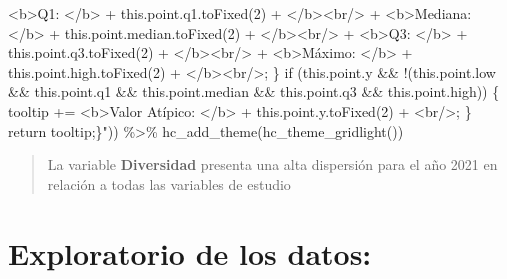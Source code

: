 \documentclass[
  10pt,
  letterpaper,
  DIV=11,
  numbers=noendperiod]{scrreprt}
\newenvironment{Shaded}{\begin{snugshade}}{\end{snugshade}}
\newcommand{\FunctionTok}[1]{\textcolor[rgb]{0.28,0.35,0.67}{#1}}
\newcommand{\NormalTok}[1]{\textcolor[rgb]{0.00,0.23,0.31}{#1}}
\newcommand{\SpecialCharTok}[1]{\textcolor[rgb]{0.37,0.37,0.37}{#1}}
\newcommand{\StringTok}[1]{\textcolor[rgb]{0.13,0.47,0.30}{#1}}
\begin{document}
\begin{Shaded}
\begin{Highlighting}[numbers=left,,]
\StringTok{                   \textquotesingle{}\textless{}b\textgreater{}Q1: \textless{}/b\textgreater{}\textquotesingle{} + this.point.q1.toFixed(2) + \textquotesingle{}\textless{}/b\textgreater{}\textless{}br/\textgreater{}\textquotesingle{} +}
\StringTok{                   \textquotesingle{}\textless{}b\textgreater{}Mediana: \textless{}/b\textgreater{}\textquotesingle{} + this.point.median.toFixed(2) + \textquotesingle{}\textless{}/b\textgreater{}\textless{}br/\textgreater{}\textquotesingle{} +}
\StringTok{                   \textquotesingle{}\textless{}b\textgreater{}Q3: \textless{}/b\textgreater{}\textquotesingle{} + this.point.q3.toFixed(2) + \textquotesingle{}\textless{}/b\textgreater{}\textless{}br/\textgreater{}\textquotesingle{} +}
\StringTok{                   \textquotesingle{}\textless{}b\textgreater{}Máximo: \textless{}/b\textgreater{}\textquotesingle{} + this.point.high.toFixed(2) + \textquotesingle{}\textless{}/b\textgreater{}\textless{}br/\textgreater{}\textquotesingle{};}
\StringTok{    \}}
\StringTok{    if (this.point.y \&\& !(this.point.low \&\& this.point.q1 \&\& this.point.median \&\& this.point.q3 \&\& this.point.high)) \{ }
\StringTok{        tooltip += \textquotesingle{}\textless{}b\textgreater{}Valor Atípico: \textless{}/b\textgreater{}\textquotesingle{} + this.point.y.toFixed(2) + \textquotesingle{}\textless{}br/\textgreater{}\textquotesingle{};}
\StringTok{    \}}
\StringTok{    return tooltip;\}"}\NormalTok{)) }\SpecialCharTok{\%\textgreater{}\%} 
    \FunctionTok{hc\_add\_theme}\NormalTok{(}\FunctionTok{hc\_theme\_gridlight}\NormalTok{())}
\end{Highlighting}
\end{Shaded}

\begin{quote}
La variable \textbf{Diversidad} presenta una alta dispersión para el año
2021 en relación a todas las variables de estudio
\end{quote}

\hypertarget{exploratorio-de-los-datos}{%
\section{Exploratorio de los datos:}\label{exploratorio-de-los-datos}}
\end{document}
